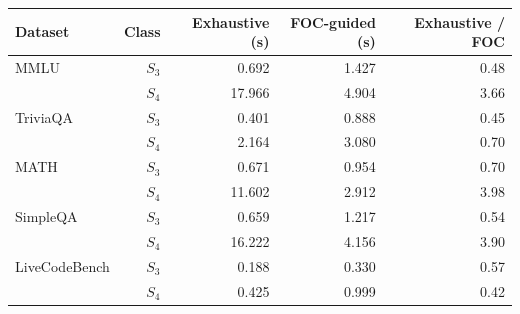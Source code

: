 \begin{tabular}{lrrrr}
\toprule
Dataset & Class & Exhaustive (s) & FOC-guided (s) & Exhaustive / FOC \\
\midrule
MMLU & $S_3$ & 0.692 & 1.427 & 0.48 \\
 & $S_4$ & 17.966 & 4.904 & 3.66 \\
TriviaQA & $S_3$ & 0.401 & 0.888 & 0.45 \\
 & $S_4$ & 2.164 & 3.080 & 0.70 \\
MATH & $S_3$ & 0.671 & 0.954 & 0.70 \\
 & $S_4$ & 11.602 & 2.912 & 3.98 \\
SimpleQA & $S_3$ & 0.659 & 1.217 & 0.54 \\
 & $S_4$ & 16.222 & 4.156 & 3.90 \\
LiveCodeBench & $S_3$ & 0.188 & 0.330 & 0.57 \\
 & $S_4$ & 0.425 & 0.999 & 0.42 \\
\bottomrule
\end{tabular}

